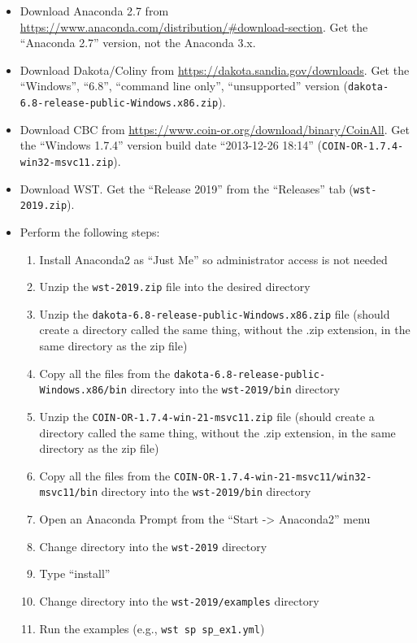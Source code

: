 \begin{itemize}
\item Download Anaconda 2.7 from \url{https://www.anaconda.com/distribution/#download-section}. Get the ``Anaconda 2.7'' version, not the Anaconda 3.x.

\item Download Dakota/Coliny from \url{https://dakota.sandia.gov/downloads}. Get the ``Windows'', ``6.8'', ``command line only'', ``unsupported'' version (\texttt{dakota-6.8-release-public-Windows.x86.zip}).

\item Download CBC from \url{https://www.coin-or.org/download/binary/CoinAll}. Get the ``Windows 1.7.4'' version build date ``2013-12-26 18:14'' (\texttt{COIN-OR-1.7.4-win32-msvc11.zip}).

\item Download WST. Get the ``Release 2019'' from the ``Releases'' tab (\texttt{wst-2019.zip}).

\item Perform the following steps:
\begin{enumerate}
\item Install Anaconda2 as ``Just Me'' so administrator access is not needed
\item Unzip the \texttt{wst-2019.zip} file into the desired directory 
\item Unzip the \texttt{dakota-6.8-release-public-Windows.x86.zip} file (should create a directory called the same thing, without the .zip extension, in the same directory as the zip file)
\item Copy all the files from the \texttt{dakota-6.8-release-public-Windows.x86/bin} directory into the \texttt{wst-2019/bin} directory
\item Unzip the \texttt{COIN-OR-1.7.4-win-21-msvc11.zip} file (should create a directory called the same thing, without the .zip extension, in the same directory as the zip file)
\item Copy all the files from the \texttt{COIN-OR-1.7.4-win-21-msvc11/win32-msvc11/bin} directory into the \texttt{wst-2019/bin} directory
\item Open an Anaconda Prompt from the ``Start -> Anaconda2'' menu
\item Change directory into the \texttt{wst-2019} directory
\item Type ``install''
\item Change directory into the \texttt{wst-2019/examples} directory
\item Run the examples (e.g., \texttt{wst sp sp\_ex1.yml})

\end{enumerate}
\end{itemize}


